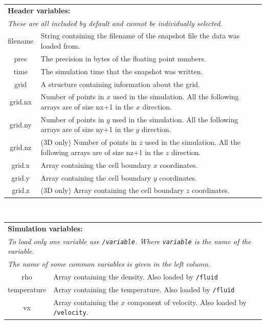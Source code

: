 \documentclass[11pt]{article}
\begin{document}
\begin{table}[!htbp]
\begin{center}
\begin{tabular}{|c|p{}|}
\multicolumn{2}{l}{{\bf Header variables:}}\\
\multicolumn{2}{l}{{\em These are all included by default and cannot be individually selected.}}\\
\hline
filename& String containing the filename of the snapshot file the data was loaded from.\\
prec& The precision in bytes of the floating point numbers.\\
time& The simulation time that the snapshot was written.\\
grid& A structure containing information about the grid.\\
grid.nx&Number of points in $x$ used in the simulation. All the following arrays are of size nx+1 in the $x$ direction.\\
grid.ny&Number of points in $y$ used in the simulation. All the following arrays are of size ny+1 in the $y$ direction.\\
grid.nz& (3D only) Number of points in $z$ used in the simulation. All the following arrays are of size nz+1 in the $z$ direction.\\
grid.x& Array containing the cell boundary $x$ coordinates.\\
grid.y& Array containing the cell boundary $y$ coordinates.\\
grid.z& (3D only) Array containing the cell boundary $z$ coordinates.\\
\hline
\end{tabular}
\vspace{0.5cm}\\
\begin{tabular}{|c|p{}|}
\multicolumn{2}{l}{{\bf Simulation variables:}}\\
\multicolumn{2}{l}{{\em To load only one variable use \texttt{/variable}. Where \texttt{variable} is the name of the variable.}}\\
\multicolumn{2}{l}{{\em The name of some common variables is given in the left column.}}\\
\hline
rho& Array containing the density. Also loaded by \texttt{/fluid}\\
temperature& Array containing the temperature. Also loaded by \texttt{/fluid}\\
vx& Array containing the $x$ component of velocity. Also loaded by \texttt{/velocity}.\\

\end{tabular}
\end{center}
\end{table}
\end{document}
